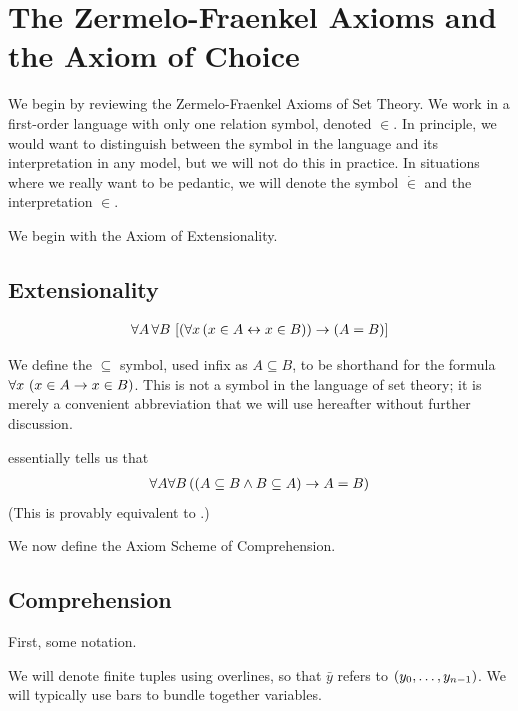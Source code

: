 \section{The Zermelo-Fraenkel Axioms and the Axiom of Choice}

We begin by reviewing the Zermelo-Fraenkel Axioms of Set Theory. We work in a first-order language with only one relation symbol, denoted $\in$. In principle, we would want to distinguish between the symbol in the language and its interpretation in any model, but we will not do this in practice. In situations where we really want to be pedantic, we will denote the symbol $\dot\in$ and the interpretation $\in$.

We begin with the Axiom of Extensionality.

\subsection{Extensionality}

\begin{baxiom}\label{ZFC:Ext}
    \begin{align*}
        \forall A \, \forall B \, \left[ \left( \forall x \left( x \in A \leftrightarrow x \in B \right) \right) \to \left( A = B \right) \right]
    \end{align*}
\end{baxiom}

We define the $\subseteq$ symbol, used infix as $A \subseteq B$, to be shorthand for the formula $\forall x \, \left( x \in A \to x \in B \right)$. This is not a symbol in the language of set theory; it is merely a convenient abbreviation that we will use hereafter without further discussion.

 essentially tells us that
\begin{align*}
    \forall A \forall B \left( \left( A \subseteq B \land B \subseteq A \right) \to A = B \right)
\end{align*}
(This is provably equivalent to .)

We now define the Axiom Scheme of Comprehension.

\subsection{Comprehension}

First, some notation.

\begin{boxnotation}
    We will denote finite tuples using overlines, so that $\bar{y}$ refers to $\left( y_0, \ldots, y_{n-1} \right)$. We will typically use bars to bundle together variables.
\end{boxnotation}

